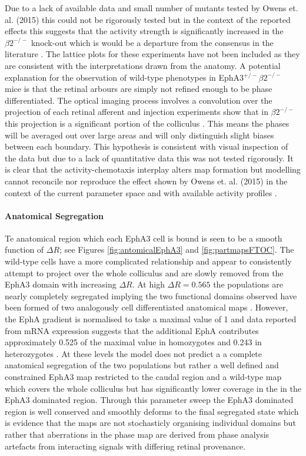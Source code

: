 Due to a lack of available data and small number of mutants tested by Owens et. al. (2015) this could not be rigorously tested but in the context of the reported effects this suggests that the activity strength is significantly increased in the $\beta2^{-/-}$ knock-out which is would be a departure from the consensus in the literature \cite{Owens2015-zv, Stafford2009}.  The lattice plots for these experiments have not been included as they are consistent with the interpretations drawn from the anatomy. A potential explanation for the observation of wild-type phenotypes in EphA3$^{+/-}\beta2^{-/-}$ mice is that the retinal arbours are simply not refined enough to be phase differentiated. The optical imaging process involves a convolution over the projection of each retinal afferent and injection experiments show that in $\beta2^{-/-}$ this projection is a significant portion of the colliculus \cite{McLaughlin2003-yy, Burbridge2014-ib}. This means the phases will be averaged out over large areas and will only distinguish slight biases between each boundary. This hypothesis is consistent with visual inspection of the data but due to a lack of quantitative data this was not tested rigorously. It is clear that the activity-chemotaxis interplay alters map formation but modelling cannot reconcile nor reproduce the effect shown by Owens et. al. (2015) in the context of the current parameter space and with available activity profiles \cite{Owens2015-zv}.  
\paragraph{Anatomical Segregation}
Te anatomical region which each EphA3 cell is bound is seen to be a smooth function of $\Delta R$; see Figures \ref{fig:antomicalEphA3} and \ref{fig:partmapsFTOC}. The wild-type cells have a more complicated relationship and appear to consistently attempt to project over the whole colliculus and are slowly removed from the EphA3 domain with increasing $\Delta R$. At high $\Delta R = 0.565$ the populations are nearly completely segregated implying the two functional domains observed have been formed of two analogously cell differentiated anatomical maps \cite{Cang2013-dw}. However, the EphA gradient is normalised to take a maximal value of 1 and data reported from mRNA expression suggests that the additional EphA contributes approximately 0.525 of the maximal value in homozygotes and 0.243 in heterozygotes \cite{Reber2004-wq}. At these levels the model does not predict a a complete anatomical segregation of the two populations but rather a well defined and constrained EphA3 map restricted to the caudal region and a wild-type map which covers the whole colliculus but has significantly lower coverage in the in the EphA3 dominated region. Through this parameter sweep the EphA3 dominated region is well conserved and smoothly deforms to the final segregated state which is evidence that the maps are not stochasticly organising individual domains but rather that aberrations in the phase map are derived from phase analysis artefacts from interacting signals with differing retinal provenance.
